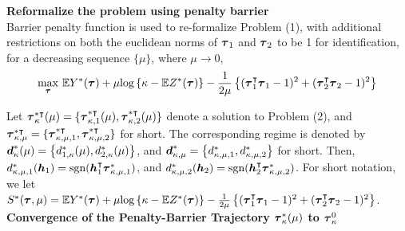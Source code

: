 \documentclass[../main.tex]{subfiles}
\begin{document}
\textbf{\large Reformalize the problem using penalty barrier}\\
Barrier penalty function is used to re-formalize  Problem (1), with additional restrictions on both the euclidean norms of $\boldsymbol{\tau}_1$ and $\boldsymbol{\tau}_2$ to be 1 for identification, for a decreasing sequence $\{\mu\}$, where $\mu \to 0$,
\begin{equation}
\underset{\boldsymbol{\tau}}{\max }\,\, \mathbb{E} Y^*(\boldsymbol{\tau}) + \mu \text{log} \left\{ \kappa - \mathbb{E} Z^*(\boldsymbol{\tau}) \right\} - \frac{1}{2\mu} \left\{ (\boldsymbol{\tau}_1^\intercal \boldsymbol{\tau}_1 -1 )^2 + (\boldsymbol{\tau}_2^\intercal \boldsymbol{\tau}_2 -1 )^2 \right\}
\end{equation}

Let $\boldsymbol{\tau}^{*\intercal}_{\kappa}(\mu) = \{\boldsymbol{\tau}^{*\intercal}_{\kappa,1}(\mu), \boldsymbol{\tau}^{*\intercal}_{\kappa,2}(\mu)\}$ denote a solution to Problem (2), and $\boldsymbol{\tau}^{*\intercal}_{\kappa,\mu} = \{\boldsymbol{\tau}^{*\intercal}_{\kappa,\mu, 1}, \boldsymbol{\tau}^{*\intercal}_{\kappa, \mu, 2}\}$ for short. The corresponding regime is denoted by $\boldsymbol{d}^*_{\kappa}(\mu) = \left\{d^*_{1,\kappa}(\mu), d^*_{2,\kappa}(\mu)\right\}$, and $\boldsymbol{d}^*_{\kappa,\mu} = \left\{d^*_{\kappa,\mu,1}, d^*_{\kappa,\mu,2}\right\}$ for short. Then, $d^*_{\kappa,\mu,1}(\boldsymbol{h}_1) = \text{sgn}(\boldsymbol{h}^\intercal_1 \boldsymbol{\tau}^*_{\kappa,\mu,1})$, and $d^*_{\kappa,\mu,2}(\boldsymbol{h}_2) = \text{sgn}(\boldsymbol{h}^\intercal_2 \boldsymbol{\tau}^*_{\kappa,\mu,2})$. For short notation, we let $S^*(\boldsymbol{\tau}, \mu) = \mathbb{E} Y^*(\boldsymbol{\tau}) + \mu \text{log} \left\{ \kappa - \mathbb{E} Z^*(\boldsymbol{\tau}) \right\} - \frac{1}{2\mu} \left\{ (\boldsymbol{\tau}_1^\intercal \boldsymbol{\tau}_1 -1 )^2 + (\boldsymbol{\tau}_2^\intercal \boldsymbol{\tau}_2 -1 )^2 \right\}$.  \\

\textbf{\large Convergence of the Penalty-Barrier Trajectory  $\boldsymbol{\tau}^*_{\kappa}(\mu)$  to $\boldsymbol{\tau}^0_{\kappa}$}\\
\end{document}
